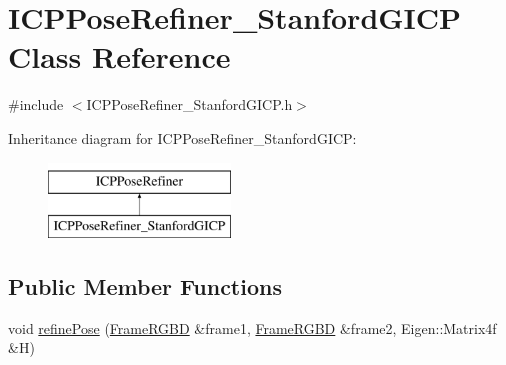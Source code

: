 \hypertarget{class_i_c_p_pose_refiner___stanford_g_i_c_p}{
\section{ICPPoseRefiner\_\-StanfordGICP Class Reference}
\label{class_i_c_p_pose_refiner___stanford_g_i_c_p}
}


{\ttfamily \#include $<$ICPPoseRefiner\_\-StanfordGICP.h$>$}

Inheritance diagram for ICPPoseRefiner\_\-StanfordGICP:\begin{figure}[H]
\begin{center}
\leavevmode
\includegraphics[height=2.000000cm]{class_i_c_p_pose_refiner___stanford_g_i_c_p}
\end{center}
\end{figure}
\subsection*{Public Member Functions}
\begin{DoxyCompactItemize}
\item 
void \hyperlink{class_i_c_p_pose_refiner___stanford_g_i_c_p_a943bad0b2578cf87723ce968e8c52580}{refinePose} (\hyperlink{class_frame_r_g_b_d}{FrameRGBD} \&frame1, \hyperlink{class_frame_r_g_b_d}{FrameRGBD} \&frame2, Eigen::Matrix4f \&H)
\end{DoxyCompactItemize}
